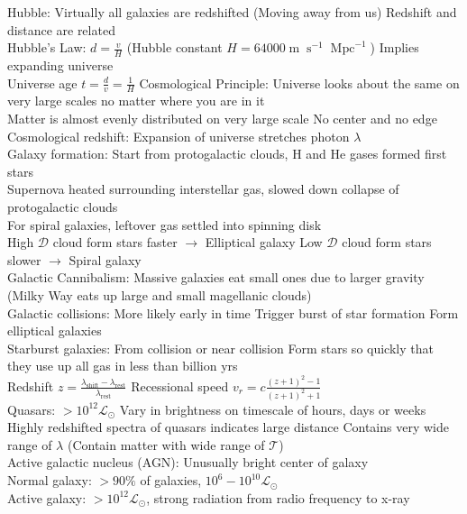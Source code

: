 \documentclass{article}
\DeclareMathOperator{\s}{s}
\DeclareMathOperator{\m}{m}
\DeclareMathOperator{\Mpc}{Mpc}
\begin{document}
Hubble: Virtually all galaxies are redshifted (Moving away from us) \quad Redshift and distance are related\\
Hubble's Law: $d=\frac{v}{H}$ (Hubble constant $H=64000\m\s^{-1}\Mpc^{-1}$) \quad Implies expanding universe\\
Universe age $t=\frac{d}{v}=\frac{1}{H}$ \quad Cosmological Principle: Universe looks about the same on very large scales no matter where you are in it\\
Matter is almost evenly distributed on very large scale \quad No center and no edge\\
Cosmological redshift: Expansion of universe stretches photon $\lambda$\\
Galaxy formation: Start from protogalactic clouds, H and He gases formed first stars\\
Supernova heated surrounding interstellar gas, slowed down collapse of protogalactic clouds \\
For spiral galaxies, leftover gas settled into spinning disk\\
High $\mathcal{D}$ cloud form stars faster $\rightarrow$ Elliptical galaxy \quad Low $\mathcal{D}$ cloud form stars slower $\rightarrow$ Spiral galaxy\\
Galactic Cannibalism: Massive galaxies eat small ones due to larger gravity (Milky Way eats up large and small magellanic clouds)\\
Galactic collisions: More likely early in time \quad Trigger burst of star formation \quad Form elliptical galaxies\\
Starburst galaxies: From collision or near collision \quad Form stars so quickly that they use up all gas in less than billion yrs\\
Redshift $z=\frac{\lambda_{\text{shift}}-\lambda_{\text{rest}}}{\lambda_{\text{rest}}}$ \qquad Recessional speed $v_{r}=c\frac{(z+1)^{2}-1}{(z+1)^{2}+1}$\\
Quasars: $>10^{12}\mathcal{L}_{\odot}$ \quad Vary in brightness on timescale of hours, days or weeks\\
Highly redshifted spectra of quasars indicates large distance \quad Contains very wide range of $\lambda$ (Contain matter with wide range of $\mathcal{T}$)\\
Active galactic nucleus (AGN): Unusually bright center of galaxy\\
Normal galaxy: $>90\%$ of galaxies, $10^{6}-10^{10}\mathcal{L}_{\odot}$ \\ Active galaxy: $>10^{12}\mathcal{L}_{\odot}$, strong radiation from radio frequency to x-ray\\
\end{document}
